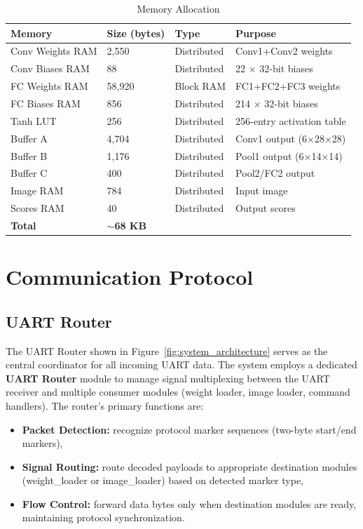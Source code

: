 \documentclass[12pt,a4paper]{report}
\begin{document}
\begin{table}[H]
\caption{Memory Allocation}
\begin{tabular}{llll}
\toprule
\textbf{Memory} & \textbf{Size (bytes)} & \textbf{Type} & \textbf{Purpose} \\
\midrule
Conv Weights RAM & 2,550 & Distributed & Conv1+Conv2 weights \\
Conv Biases RAM & 88 & Distributed & 22 $\times$ 32-bit biases \\
FC Weights RAM & 58,920 & Block RAM & FC1+FC2+FC3 weights \\
FC Biases RAM & 856 & Distributed & 214 $\times$ 32-bit biases \\
Tanh LUT & 256 & Distributed & 256-entry activation table \\
Buffer A & 4,704 & Distributed & Conv1 output (6$\times$28$\times$28) \\
Buffer B & 1,176 & Distributed & Pool1 output (6$\times$14$\times$14) \\
Buffer C & 400 & Distributed & Pool2/FC2 output \\
Image RAM & 784 & Distributed & Input image \\
Scores RAM & 40 & Distributed & Output scores \\
\midrule
\textbf{Total} & \textbf{$\sim$68 KB} & & \\
\bottomrule
\end{tabular}
\end{table}

\section{Communication Protocol}

\subsection{UART Router}

The UART Router shown in Figure~\ref{fig:system_architecture} serves as the central coordinator for all incoming UART data. The system employs a dedicated \textbf{UART Router} module to manage signal multiplexing between the UART receiver and multiple consumer modules (weight loader, image loader, command handlers). The router's primary functions are:

\begin{itemize}
    \item \textbf{Packet Detection:} recognize protocol marker sequences (two-byte start/end markers),
    \item \textbf{Signal Routing:} route decoded payloads to appropriate destination modules (weight\_loader or image\_loader) based on detected marker type,
    \item \textbf{Flow Control:} forward data bytes only when destination modules are ready, maintaining protocol synchronization.
\end{itemize}
\end{document}
